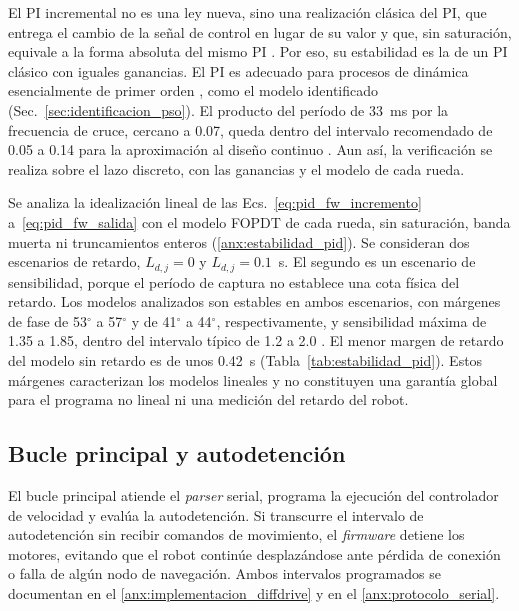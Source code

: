 El PI incremental no es una ley nueva, sino una realización clásica del PI, que
entrega el cambio de la señal de control en lugar de su valor y que, sin
saturación, equivale a la forma absoluta del mismo PI
\parencites[Sec.~13.4]{astrom2009controlpid}[Sec.~8]{wittenmark_ifac_computer}.
Por eso, su estabilidad es la de un PI clásico con iguales ganancias. El PI es adecuado
para procesos de dinámica esencialmente de primer orden
\citep[Sec.~3.6]{astrom2009controlpid}, como el modelo identificado
(Sec.~\ref{sec:identificacion_pso}). El producto del período de 33~ms por la
frecuencia de cruce, cercano a 0.07, queda dentro del intervalo recomendado de
0.05 a 0.14 para la aproximación al diseño continuo
\citep[Secs.~6 y 8]{wittenmark_ifac_computer}. Aun así, la verificación se
realiza sobre el lazo discreto, con las ganancias y el modelo de cada rueda.

Se analiza la idealización lineal de las
Ecs.~\eqref{eq:pid_fw_incremento} a~\eqref{eq:pid_fw_salida} con el modelo FOPDT
de cada rueda, sin saturación, banda muerta ni truncamientos enteros
(\ref{anx:estabilidad_pid}). Se consideran dos escenarios de retardo,
$L_{d,j}=0$ y $L_{d,j}=0.1$~s. El segundo es un escenario de sensibilidad,
porque el período de captura no establece una cota física del retardo. Los
modelos analizados son estables en ambos escenarios, con márgenes de fase de
53$^\circ$ a 57$^\circ$ y de 41$^\circ$ a 44$^\circ$, respectivamente, y
sensibilidad máxima de 1.35 a 1.85, dentro del intervalo típico de 1.2 a 2.0
\citep[Sec.~5]{wittenmark_ifac_computer}. El menor margen de retardo del modelo
sin retardo es de unos 0.42~s (Tabla~\ref{tab:estabilidad_pid}). Estos márgenes
caracterizan los modelos lineales y no constituyen una garantía global para
el programa no lineal ni una medición del retardo del robot.

\subsection{Bucle principal y autodetención}
\label{sec:bucle_principal}

El bucle principal atiende el \textit{parser} serial, programa la ejecución del controlador de velocidad y evalúa la autodetención. Si transcurre el intervalo de autodetención sin recibir comandos de movimiento, el \textit{firmware} detiene los motores, evitando que el robot continúe desplazándose ante pérdida de conexión o falla de algún nodo de navegación. Ambos intervalos programados se documentan en el \ref{anx:implementacion_diffdrive} y en el \ref{anx:protocolo_serial}.

